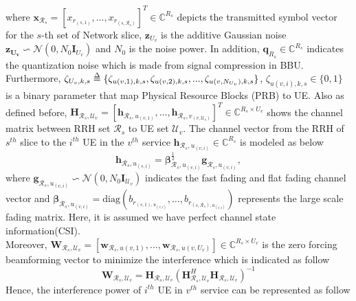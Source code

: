 \documentclass[conference]{IEEEtran}
\def\delequal{\mathrel{\ensurestackMath{\stackon[1pt]{=}{\scriptstyle\Delta}}}}
\begin{document}
where $\boldsymbol{x}_{ \mathcal{R}_s} = [x_{ r_{(s,1)}},...,x_{ r_{(s,\mathcal{R}_s)}}]^T \in \mathbb{C}^{{R}_s } $ depicts the transmitted symbol vector for the $s$-th set of Network slice,  $\boldsymbol{z}_{U_v}$ is the additive Gaussian noise $\boldsymbol{z_{U_v}} \backsim \mathcal{N}(0,N_0\boldsymbol{I}_{{U}_v})$ and $N_0$ is the noise power.
In addition, $\boldsymbol{q}_{R_s} \in \mathbb{C}^{{R}_s }  $ indicates the quantization noise which is made from signal compression in BBU.
\\
Furthermore, $\zeta_{U_v,k,s} \delequal \{\zeta_{u(v,1),k,s},\zeta_{u(v,2),k,s},...,\zeta_{u(v,N_{U_v}),k,s}\}$,
$\zeta_{u(v,i),k,s} \in \{0,1\}$ is a binary parameter that map Physical Resource Blocks (PRB) to UE.
Also as defined before, $\boldsymbol{H}_{\mathcal{R}_s,\mathcal{U}_v}=\left[\boldsymbol{h}_{\mathcal{R}_s,u_{(v,1)}},\ldots,\boldsymbol{h}_{\mathcal{R}_s,v_{(v,\mathcal{U}_v)}}\right]^T  \in \mathbb{C}^{{R}_s\times {U}_v }$ 
shows the channel matrix between RRH set $\mathcal{R}_s$ to UE set
$\mathcal{U}_v$. 
The channel vector from the RRH of  $s^{th}$ slice to the $i^{th}$ UE in the $v^{th}$ service $\boldsymbol{h}_{\mathcal{R}_s,u_{(v,i)}}\in \mathbb{C}^{{R}_s}$ is modeled as below
\begin{equation}
\boldsymbol{h}_{\mathcal{R}_s,u_{(s,i)}} = \boldsymbol{\beta}^\frac{1}{2}_{\mathcal{R}_s,u_{(v,i)}} \boldsymbol{g}_{\mathcal{R}_s,u_{(v,i)}},
\end{equation}
where $\boldsymbol{g}_{\mathcal{R}_s,u_{(v,i)}} \backsim \mathcal{N}(0,N_0\boldsymbol{I}_{\mathcal{U}_v})$ indicates the fast fading and flat fading channel vector and $\boldsymbol{\beta}_{\mathcal{R}_s,u_{(v,i)}}=\text{diag}(b_{r_{(s,1),u_{(v,i)}}},\ldots,b_{r_{(s,\mathcal{R}_s),u_{(v,i)}}})$
represents the large scale fading matrix. Here, it is assumed we have perfect channel state information(CSI).
\\
Moreover, $\boldsymbol{W}_{\mathcal{R}_s,\mathcal{U}_v} = [\boldsymbol{w}_{\mathcal{R}_s,u(v,1)},...,\boldsymbol{w}_{\mathcal{R}_s,u(v,U_v)}] \in \mathbb{C}^{{R}_s\times U_v} $ is the zero forcing beamforming vector to minimize the interference which is indicated as follow
\begin{equation}
\boldsymbol{W}_{\mathcal{R}_s,\mathcal{U}_v} = \boldsymbol{H}_{\mathcal{R}_s,\mathcal{U}_v}(\boldsymbol{H}_{\mathcal{R}_s,\mathcal{U}_v}^H \boldsymbol{H}_{\mathcal{R}_s,\mathcal{U}_v})^{-1}
\end{equation}
Hence, the interference power of $i^{th}$ UE in $v^{th}$ service can be represented as follow
\end{document}
